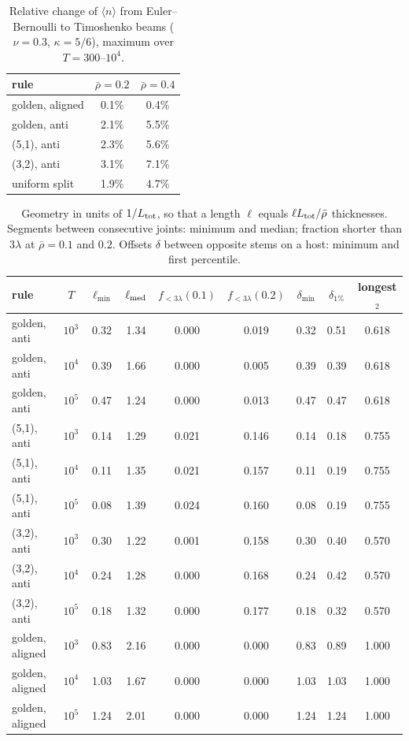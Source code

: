 \begin{table}[h]\caption{Relative change of $\langle n\rangle$ from Euler--Bernoulli to Timoshenko beams ($\nu=0.3$, $\kappa=5/6$), maximum over $T=300$--$10^{4}$.}\label{tab:timo}
\begin{ruledtabular}\begin{tabular}{lcc}rule & $\bar\rho=0.2$ & $\bar\rho=0.4$ \\ \hline
golden, aligned & 0.1\% & 0.4\% \\
golden, anti & 2.1\% & 5.5\% \\
(5,1), anti & 2.3\% & 5.6\% \\
(3,2), anti & 3.1\% & 7.1\% \\
uniform split & 1.9\% & 4.7\% \\
\end{tabular}\end{ruledtabular}\end{table}
\begin{table}[h]\caption{Geometry in units of $1/L_{\rm tot}$, so that a length $\ell$ equals $\ell L_{\rm tot}/\bar\rho$ thicknesses. Segments between consecutive joints: minimum and median; fraction shorter than $3\lambda$ at $\bar\rho=0.1$ and $0.2$. Offsets $\delta$ between opposite stems on a host: minimum and first percentile.}\label{tab:geo}
\begin{ruledtabular}\begin{tabular}{lcccccccc}
rule & $T$ & $\ell_{\min}$ & $\ell_{\rm med}$ & $f_{<3\lambda}(0.1)$ & $f_{<3\lambda}(0.2)$ & $\delta_{\min}$ & $\delta_{1\%}$ & longest$_2$ \\ \hline
golden, anti & $10^{3}$ & 0.32 & 1.34 & 0.000 & 0.019 & 0.32 & 0.51 & 0.618 \\
golden, anti & $10^{4}$ & 0.39 & 1.66 & 0.000 & 0.005 & 0.39 & 0.39 & 0.618 \\
golden, anti & $10^{5}$ & 0.47 & 1.24 & 0.000 & 0.013 & 0.47 & 0.47 & 0.618 \\
(5,1), anti & $10^{3}$ & 0.14 & 1.29 & 0.021 & 0.146 & 0.14 & 0.18 & 0.755 \\
(5,1), anti & $10^{4}$ & 0.11 & 1.35 & 0.021 & 0.157 & 0.11 & 0.19 & 0.755 \\
(5,1), anti & $10^{5}$ & 0.08 & 1.39 & 0.024 & 0.160 & 0.08 & 0.19 & 0.755 \\
(3,2), anti & $10^{3}$ & 0.30 & 1.22 & 0.001 & 0.158 & 0.30 & 0.40 & 0.570 \\
(3,2), anti & $10^{4}$ & 0.24 & 1.28 & 0.000 & 0.168 & 0.24 & 0.42 & 0.570 \\
(3,2), anti & $10^{5}$ & 0.18 & 1.32 & 0.000 & 0.177 & 0.18 & 0.32 & 0.570 \\
golden, aligned & $10^{3}$ & 0.83 & 2.16 & 0.000 & 0.000 & 0.83 & 0.89 & 1.000 \\
golden, aligned & $10^{4}$ & 1.03 & 1.67 & 0.000 & 0.000 & 1.03 & 1.03 & 1.000 \\
golden, aligned & $10^{5}$ & 1.24 & 2.01 & 0.000 & 0.000 & 1.24 & 1.24 & 1.000 \\
\end{tabular}\end{ruledtabular}\end{table}
